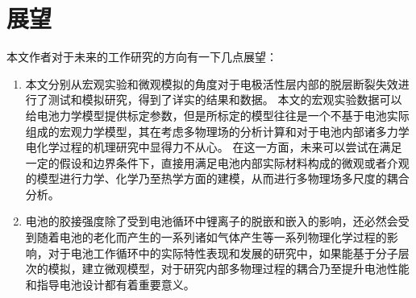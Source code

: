 \section{展望}
本文作者对于未来的工作研究的方向有一下几点展望：
\begin{enumerate}
	\item 本文分别从宏观实验和微观模拟的角度对于电极活性层内部的脱层断裂失效进行了测试和模拟研究，得到了详实的结果和数据。 本文的宏观实验数据可以给电池力学模型提供标定参数，但是所标定的模型往往是一个不基于电池实际组成的宏观力学模型，其在考虑多物理场的分析计算和对于电池内部诸多力学电化学过程的机理研究中显得力不从心。 在这一方面，未来可以尝试在满足一定的假设和边界条件下，直接用满足电池内部实际材料构成的微观或者介观的模型进行力学、化学乃至热学方面的建模，从而进行多物理场多尺度的耦合分析。
	\item 电池的胶接强度除了受到电池循环中锂离子的脱嵌和嵌入的影响，还必然会受到随着电池的老化而产生的一系列诸如气体产生等一系列物理化学过程的影响，对于电池工作循环中的实际特性表现和发展的研究中，如果能基于分子层次的模拟，建立微观模型，对于研究内部多物理过程的耦合乃至提升电池性能和指导电池设计都有着重要意义。
\end{enumerate}